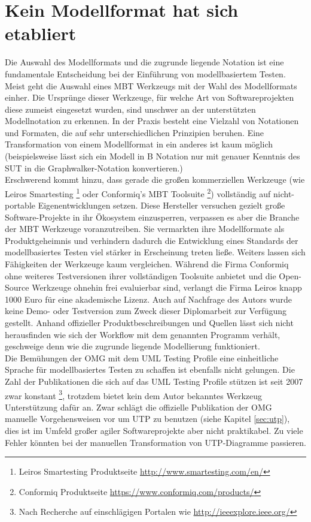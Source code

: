 \section{Kein Modellformat hat sich etabliert}
\label{sec:discussion_format}
Die Auswahl des Modellformats und die zugrunde liegende Notation ist eine fundamentale Entscheidung bei der Einführung von modellbasiertem Testen. Meist geht die Auswahl eines \Gls{MBT} Werkzeugs mit der Wahl des Modellformats einher. Die Ursprünge dieser Werkzeuge, für welche Art von Softwareprojekten diese zumeist eingesetzt wurden, sind unschwer an der unterstützten Modellnotation zu erkennen.  In der Praxis besteht eine Vielzahl von Notationen und Formaten, die auf sehr unterschiedlichen Prinzipien beruhen. Eine Transformation von einem Modellformat in ein anderes ist kaum möglich (beispielsweise lässt sich ein Modell in B Notation nur mit genauer Kenntnis des \Gls{SUT} in die Graphwalker-Notation konvertieren.)\\
Erschwerend kommt hinzu, dass gerade die großen kommerziellen Werkzeuge (wie Leiros Smartesting \footnote{Leiros Smartesting Produktseite \url{http://www.smartesting.com/en/}} oder Conformiq's \Gls{MBT} Toolsuite \footnote{Conformiq Produktseite \url{https://www.conformiq.com/products/}}) vollständig auf nicht-portable Eigenentwicklungen setzen. Diese Hersteller versuchen gezielt große Software-Projekte in ihr Ökosystem einzusperren, verpassen es aber die Branche der \Gls{MBT} Werkzeuge voranzutreiben. Sie vermarkten ihre Modellformate als Produktgeheimnis und verhindern dadurch die Entwicklung eines Standards der modellbasiertes Testen viel stärker in Erscheinung treten ließe. Weiters lassen sich Fähigkeiten der Werkzeuge kaum vergleichen. Während die Firma Conformiq ohne weiteres Testversionen ihrer vollständigen Toolsuite anbietet und die Open-Source Werkzeuge ohnehin frei evaluierbar sind, verlangt die Firma Leiros knapp 1000 Euro für eine akademische Lizenz. Auch auf Nachfrage des Autors wurde keine Demo- oder Testversion zum Zweck dieser Diplomarbeit zur Verfügung gestellt. Anhand offizieller Produktbeschreibungen und Quellen lässt sich nicht herausfinden wie sich der Workflow mit dem genannten Programm verhält, geschweige denn wie die zugrunde liegende Modellierung funktioniert.\\
Die Bemühungen der \Gls{OMG} mit dem UML Testing Profile eine einheitliche Sprache für modellbasiertes Testen zu schaffen ist ebenfalls nicht gelungen. Die Zahl der Publikationen die sich auf das UML Testing Profile stützen ist seit 2007 zwar konstant \footnote{Nach Recherche auf einschlägigen Portalen wie \url{http://ieeexplore.ieee.org/}}, trotzdem bietet kein dem Autor bekanntes Werkzeug Unterstützung dafür an. Zwar schlägt die offizielle Publikation der \Gls{OMG} \cite{_model-driven_2007} manuelle Vorgehensweisen vor um \Gls{UTP} zu benutzen (siehe Kapitel \ref{sec:utp}), dies ist im Umfeld großer agiler Softwareprojekte aber nicht praktikabel. Zu viele Fehler könnten bei der manuellen Transformation von \Gls{UTP}-Diagramme passieren.\\
